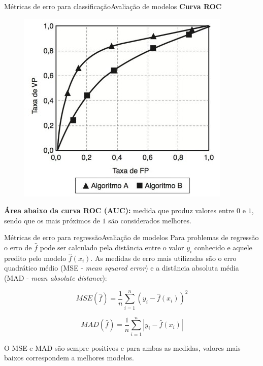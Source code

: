 \documentclass[t]{beamer}
\begin{document}

\begin{ftst}{Métricas de erro para classificação}{Avaliação de modelos}
\justifying
\small
\textbf{Curva ROC} 

\begin{figure}
    \centering
    \includegraphics[scale=0.5]{Figuras/slide04_08.jpg}
\end{figure}

\textbf{Área abaixo da curva ROC (AUC):} medida que produz valores entre $0$ e $1$, sendo que os mais próximos de $1$ são considerados melhores.
\end{ftst}


\begin{ftst}{Métricas de erro para regressão}{Avaliação de modelos}
\justifying
Para problemas de regressão o erro de $\hat{f}$ pode ser calculado pela distância entre o valor $y_i$ conhecido e aquele predito pelo modelo $\hat{f}(x_i)$. 
\vone
As medidas de erro mais utilizadas são o erro quadrático médio (MSE - \textit{mean squared error}) e a distância absoluta média (MAD - \textit{mean absolute distance}):

\begin{equation}
    MSE (\hat{f}) = \frac{1}{n} \sum_{i=1}^{n}(y_i - \hat{f}(x_i))^2
\end{equation}

\begin{equation}
    MAD (\hat{f}) = \frac{1}{n} \sum_{i=1}^{n}|y_i - \hat{f}(x_i)|
\end{equation}

O MSE e MAD são sempre positivos e para ambas as medidas, valores mais baixos correspondem a melhores modelos.

\end{ftst}
\end{document}
